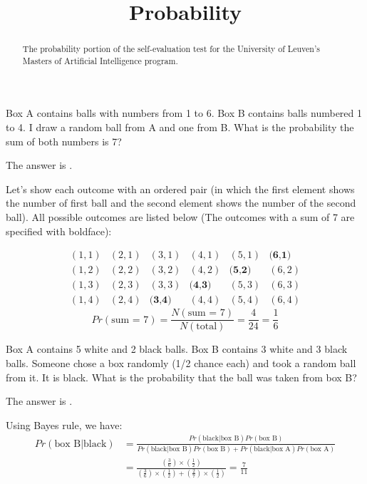 \documentclass{ximera}
\title{Probability}
\begin{document}
\begin{abstract}
The probability portion of the self-evaluation test for the University
of Leuven's Masters of Artificial Intelligence program.
\end{abstract}
\maketitle


\begin{question}
Box A contains balls with numbers from 1 to 6.  Box B contains balls
numbered 1 to 4.  I draw a random ball from A and one from B.  What is
the probability the sum of both numbers is 7?
\begin{solution}
The answer is .
\end{solution}
Let's show each outcome with an ordered pair (in which the first
element shows the number of first ball and the second element shows
the number of the second ball). All possible outcomes are listed below
(The outcomes with a sum of 7 are specified with boldface):


\[
\begin{matrix}
(1,1) & (2,1) & (3,1) & (4,1) & (5,1) & \textbf{(6,1)} \\
(1,2) & (2,2) & (3,2) & (4,2) & \textbf{(5,2)} & (6,2) \\
(1,3) & (2,3) & (3,3) & \textbf{(4,3)} & (5,3) & (6,3) \\
(1,4) & (2,4) & \textbf{(3,4)} & (4,4) & (5,4) & (6,4)
\end{matrix}
\]
\[
Pr (\text{sum = 7}) = \frac{N(\text{sum = 7})}{N(\text{total})} =
\frac{4}{24} = \frac{1}{6}
\]
\end{question}

\begin{question}
Box A contains 5 white and 2 black balls.  Box B contains 3 white and
3 black balls.  Someone chose a box randomly (1/2 chance each) and
took a random ball from it.  It is black.  What is the probability
that the ball was taken from box B?
\begin{solution}
The answer is .
\end{solution}
Using Bayes rule, we have:
\begin{align*}
Pr (\text{box B} | \text{black}) &= \frac{Pr(\text{black} | \text{box B}) Pr(\text{box B})}{Pr(\text{black} | \text{box B}) Pr(\text{box B}) + Pr(\text{black} | \text{box A}) Pr(\text{box A})} \\
&=\frac{(\frac{3}{6}) \times (\frac{1}{2})}{(\frac{3}{6}) \times (\frac{1}{2}) + (\frac{2}{7}) \times (\frac{1}{2})} = \frac{7}{11}
\end{align*}
\end{question}
\end{document}
